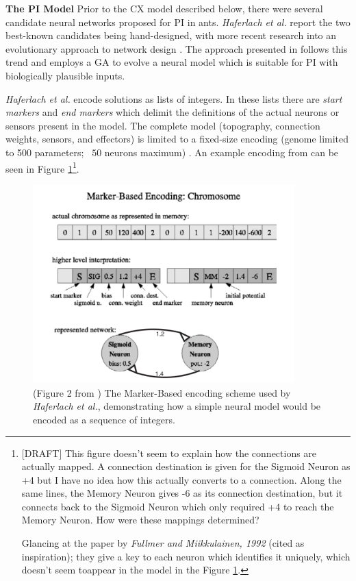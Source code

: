 \documentclass[a4paper,11pt,twoside,openright]{article}
\begin{document}
\textbf{The PI Model}\newline
Prior to the CX model described below, there were several candidate neural
networks proposed for PI in ants. \textit{Haferlach et al.} report the
two best-known candidates being hand-designed, with more recent research
into an evolutionary approach to network design \cite{Haferlach2007}. The
approach presented in \cite{Haferlach2007} follows this trend and employs
a GA to evolve a neural model which is suitable for PI with
biologically plausible inputs.
\newline
\par

\textit{Haferlach et al.} encode solutions as lists of integers. In these lists
there are \textit{start markers} and \textit{end markers} which delimit
the definitions of the actual neurons or sensors present in the model. The
complete model (topography, connection weights, sensors, and effectors) is
limited to a fixed-size encoding (genome limited to 500 parameters; ~$50$ neurons
maximum) \cite{Haferlach2007}. An example encoding from \cite{Haferlach2007} can
be seen in Figure \ref{fig:markerbasedencoding}\footnote{[DRAFT] This figure
  doesn't seem to explain how the connections are actually mapped. A connection
  destination is given for the Sigmoid Neuron as +4 but I have no idea
  how this actually converts to a connection. Along the same lines, the
  Memory Neuron gives -6 as its connection destination, but it connects back
  to the Sigmoid Neuron which only required +4 to reach the Memory Neuron. How
  were these mappings determined?

  Glancing at the paper by \textit{Fullmer and Miikkulainen, 1992} (cited as
  inspiration); they give a key to each neuron which identifies it uniquely,
  which doesn't seem toappear in the model in the Figure
  \ref{fig:markerbasedencoding}.
}.
\newline
\par


\begin{figure}[h!]
  \centering
  \includegraphics[width=0.9\textwidth]{MarkerBasedEncoding}
  \caption{\label{fig:markerbasedencoding} (Figure 2 from \cite{Haferlach2007})
    The Marker-Based encoding scheme used by \textit{Haferlach et al.},
    demonstrating how a simple neural model would be encoded as a sequence of
    integers.}
\end{figure}
\end{document}

